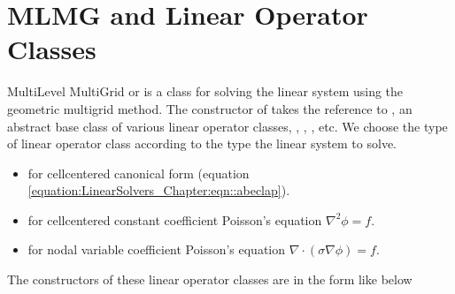 \documentclass[letterpaper,10pt,english]{sphinxmanual}
\begin{document}
\section{MLMG and Linear Operator Classes}
\label{\detokenize{LinearSolvers:mlmg-and-linear-operator-classes}}\label{\detokenize{LinearSolvers::doc}}
\sphinxAtStartPar
Multi\sphinxhyphen{}Level Multi\sphinxhyphen{}Grid or  is a class for solving the linear
system using the geometric multigrid method.  The constructor of
 takes the reference to , an abstract base
class of various linear operator
classes, , ,
, etc.  We choose the type of linear operator
class according to the type the linear system to solve.
\begin{itemize}
\item {} 
\sphinxAtStartPar
{} for cell\sphinxhyphen{}centered canonical form (equation \eqref{equation:LinearSolvers_Chapter:eqn::abeclap}).

\item {} 
\sphinxAtStartPar
{} for cell\sphinxhyphen{}centered constant coefficient Poisson’s
equation \(\nabla^2 \phi = f\).

\item {} 
\sphinxAtStartPar
{} for nodal variable coefficient Poisson’s
equation \(\nabla \cdot (\sigma \nabla \phi) = f\).

\end{itemize}

\sphinxAtStartPar
The constructors of these linear operator classes are in the form like
below

\begin{sphinxVerbatim}[commandchars=\\\{\}]
   
                   
                   
                     
                      
\end{sphinxVerbatim}
\end{document}
